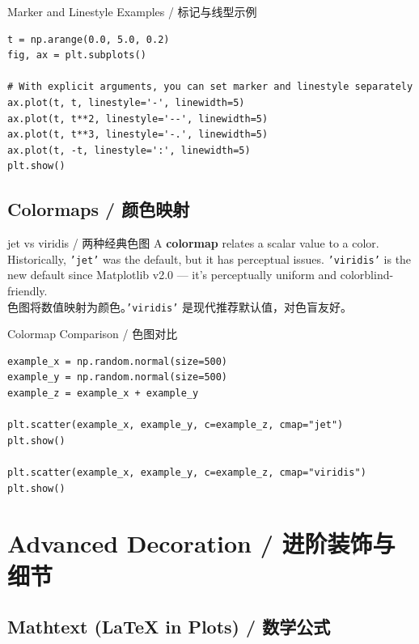 \documentclass[11pt,a4paper]{report}
\let\oldtexttt\texttt
\renewcommand{\texttt}[1]{\textcolor{mainblue}{\oldtexttt{#1}}}
\begin{document}
\begin{examplebox}{Marker and Linestyle Examples / 标记与线型示例}
\begin{lstlisting}
t = np.arange(0.0, 5.0, 0.2)
fig, ax = plt.subplots()

# With explicit arguments, you can set marker and linestyle separately
ax.plot(t, t, linestyle='-', linewidth=5)
ax.plot(t, t**2, linestyle='--', linewidth=5)
ax.plot(t, t**3, linestyle='-.', linewidth=5)
ax.plot(t, -t, linestyle=':', linewidth=5)
plt.show()
\end{lstlisting}
\end{examplebox}

\subsection{Colormaps / 颜色映射}

\begin{concept}{jet vs viridis / 两种经典色图}
    A \textbf{colormap} relates a scalar value to a color. Historically, \texttt{'jet'} was the default, but it has perceptual issues. \texttt{'viridis'} is the new default since Matplotlib v2.0 — it's perceptually uniform and colorblind-friendly. \\
    色图将数值映射为颜色。\texttt{'viridis'} 是现代推荐默认值，对色盲友好。
\end{concept}

\begin{examplebox}{Colormap Comparison / 色图对比}
\begin{lstlisting}
example_x = np.random.normal(size=500)
example_y = np.random.normal(size=500)
example_z = example_x + example_y

plt.scatter(example_x, example_y, c=example_z, cmap="jet")
plt.show()

plt.scatter(example_x, example_y, c=example_z, cmap="viridis")
plt.show()
\end{lstlisting}
\end{examplebox}

\section{Advanced Decoration / 进阶装饰与细节}

\subsection{Mathtext (LaTeX in Plots) / 数学公式}
\end{document}
